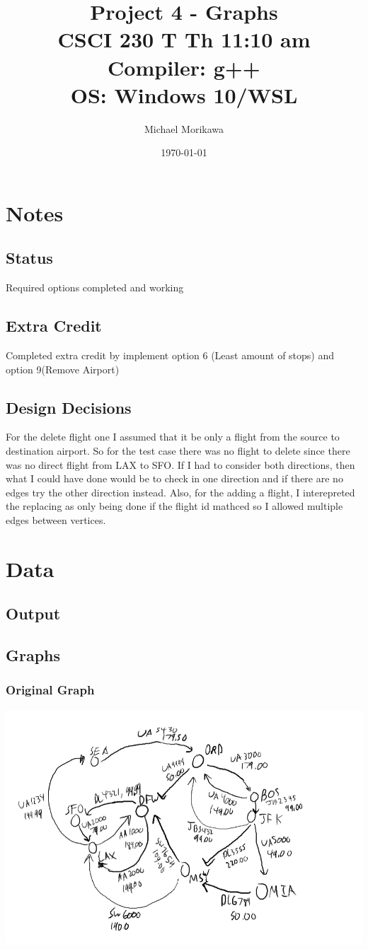 \documentclass[titlepage]{article}
\title{
    Project 4 - Graphs\\
    CSCI 230 T Th 11:10 am \\
    Compiler: g++ \\
    OS: Windows 10/WSL
    }
\author{Michael Morikawa}
\date{\today}
\begin{document}
\maketitle

\section{Notes}
\subsection{Status}
Required options completed and working
\subsection{Extra Credit}
Completed extra credit by implement option 6 (Least amount of stops) and option 9(Remove Airport)
\subsection{Design Decisions}
For the delete flight one I assumed that it be only a flight from the source to destination airport. So for the test
case there was no flight to delete since there was no direct flight from LAX to SFO. If I had to consider both directions,
then what I could have done would be to check in one direction and if there are no edges try the other direction instead.
Also, for the adding a flight, I interepreted the replacing as only being done if the flight id mathced so I allowed multiple
edges between vertices.


\newpage

\section{Data}
\subsection{Output}

\subsection{Graphs}
\subsubsection{Original Graph}
\includegraphics[scale=0.4]{ogGraph.png}
\end{document}
